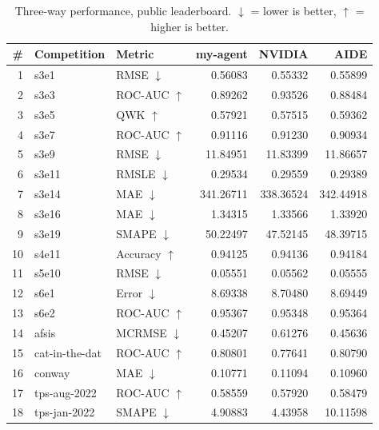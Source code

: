 \documentclass[11pt,a4paper]{article}
\newcommand{\dn}{\ensuremath{\downarrow}}
\newcommand{\up}{\ensuremath{\uparrow}}
\begin{document}
\begin{table}[htbp]
\centering\small
\caption{Three-way performance, public leaderboard. \dn{} = lower is better, \up{} = higher is better.}
\label{tab:public}
\begin{tabular}{@{}rllrrr@{}}
\toprule
\# & \textbf{Competition} & \textbf{Metric} & \textbf{my-agent} & \textbf{NVIDIA} & \textbf{AIDE} \\
\midrule
1 & s3e1 & RMSE \dn & 0.56083 & 0.55332 & 0.55899 \\
2 & s3e3 & ROC-AUC \up & 0.89262 & 0.93526 & 0.88484 \\
3 & s3e5 & QWK \up & 0.57921 & 0.57515 & 0.59362 \\
4 & s3e7 & ROC-AUC \up & 0.91116 & 0.91230 & 0.90934 \\
5 & s3e9 & RMSE \dn & 11.84951 & 11.83399 & 11.86657 \\
6 & s3e11 & RMSLE \dn & 0.29534 & 0.29559 & 0.29389 \\
7 & s3e14 & MAE \dn & 341.26711 & 338.36524 & 342.44918 \\
8 & s3e16 & MAE \dn & 1.34315 & 1.33566 & 1.33920 \\
9 & s3e19 & SMAPE \dn & 50.22497 & 47.52145 & 48.39715 \\
10 & s4e11 & Accuracy \up & 0.94125 & 0.94136 & 0.94184 \\
11 & s5e10 & RMSE \dn & 0.05551 & 0.05562 & 0.05555 \\
12 & s6e1 & Error \dn & 8.69338 & 8.70480 & 8.69449 \\
13 & s6e2 & ROC-AUC \up & 0.95367 & 0.95348 & 0.95364 \\
14 & afsis & MCRMSE \dn & 0.45207 & 0.61276 & 0.45636 \\
15 & cat-in-the-dat & ROC-AUC \up & 0.80801 & 0.77641 & 0.80790 \\
16 & conway & MAE \dn & 0.10771 & 0.11094 & 0.10960 \\
17 & tps-aug-2022 & ROC-AUC \up & 0.58559 & 0.57920 & 0.58479 \\
18 & tps-jan-2022 & SMAPE \dn & 4.90883 & 4.43958 & 10.11598 \\
\bottomrule
\end{tabular}
\end{table}
\end{document}

